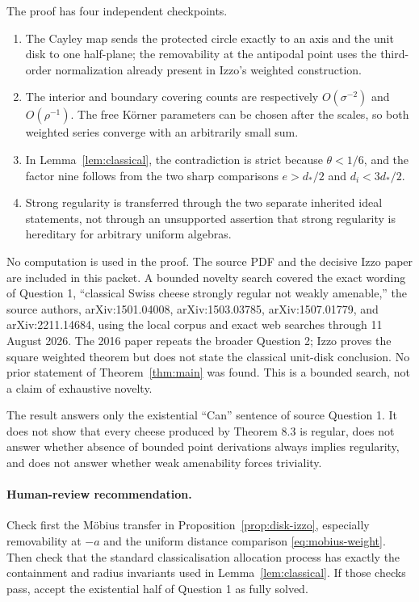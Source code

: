 \documentclass[11pt]{article}
\begin{document}
The proof has four independent checkpoints.
\begin{enumerate}
\item The Cayley map sends the protected circle exactly to an axis and the
unit disk to one half-plane; the removability at the antipodal point uses the
third-order normalization already present in Izzo's weighted construction.
\item The interior and boundary covering counts are respectively
$O(\sigma^{-2})$ and $O(\rho^{-1})$.  The free K\"orner parameters can be
chosen after the scales, so both weighted series converge with an arbitrarily
small sum.
\item In Lemma~\ref{lem:classical}, the contradiction is strict because
$\theta<1/6$, and the factor nine follows from the two sharp comparisons
$e>d_*/2$ and $d_i<3d_*/2$.
\item Strong regularity is transferred through the two separate inherited
ideal statements, not through an unsupported assertion that strong
regularity is hereditary for arbitrary uniform algebras.
\end{enumerate}

No computation is used in the proof.  The source PDF and the decisive Izzo
paper are included in this packet.  A bounded novelty search covered the
exact wording of Question 1, ``classical Swiss cheese strongly regular not
weakly amenable,'' the source authors, arXiv:1501.04008, arXiv:1503.03785,
arXiv:1507.01779, and arXiv:2211.14684, using the local corpus and exact web
searches through 11 August 2026.  The 2016 paper repeats the broader Question
2; Izzo proves the square weighted theorem but does not state the classical
unit-disk conclusion.  No prior statement of Theorem~\ref{thm:main} was
found.  This is a bounded search, not a claim of exhaustive novelty.

The result answers only the existential ``Can'' sentence of source Question
1.  It does not show that every cheese produced by Theorem 8.3 is regular,
does not answer whether absence of bounded point derivations always implies
regularity, and does not answer whether weak amenability forces triviality.

\paragraph{Human-review recommendation.}
Check first the M\"obius transfer in Proposition~\ref{prop:disk-izzo},
especially removability at $-a$ and the uniform distance comparison
\eqref{eq:mobius-weight}.  Then check that the standard classicalisation
allocation process has exactly the containment and radius invariants used in
Lemma~\ref{lem:classical}.  If those checks pass, accept the existential half
of Question 1 as fully solved.
\end{document}
